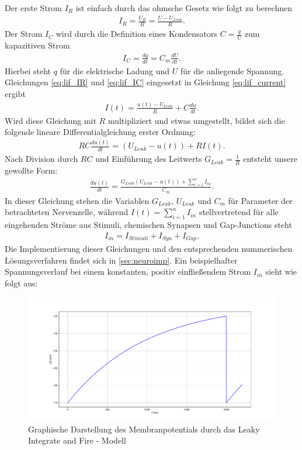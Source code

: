 	Der erste Strom $I_R$ ist einfach durch das ohmsche Gesetz wie folgt zu berechnen
	\begin{align}
		\label{eq:lif_IR}
		I_R = \frac{U_R}{R} = \frac{U - U_{Leak}}{R}\text{.}
	\end{align}
	Der Strom $I_C$ wird durch die Definition eines Kondensators $C = \tfrac{q}{U}$ zum kapazitiven Strom 
	\begin{align}
		\label{eq:lif_IC}
		I_C = \frac{dq}{dt} = C_m \frac{dU}{dt}\text{.}
	\end{align}
	Hierbei steht $q$ für die elektrische Ladung und $U$ für die anliegende Spannung.\\
	Gleichungen \ref{eq:lif_IR} und \ref{eq:lif_IC} eingesetzt in Gleichung \ref{eq:lif_current} ergibt
	\begin{align}
		\label{eq:lif_I}
		I(t) = \frac{u(t) - U_{Leak}}{R} + C\frac{du}{dt}\text{.}
	\end{align}
	Wird diese Gleichung mit $R$ multipliziert und etwas umgestellt, bildet sich die folgende lineare Differentialgleichung erster Ordnung:
	\begin{align}
		\label{eq:lif_nd}
		R C \frac{du(t)}{dt} = (U_{Leak} - u(t)) + R I(t)\text{.}
	\end{align}
	Nach Division durch $RC$ und Einführung des Leitwerts $G_{Leak} = \tfrac{1}{R}$ entsteht unsere gewollte Form:
	\begin{align}
		\label{eq:lif}
		\frac{du(t)}{dt} = \frac{G_{Leak}(U_{Leak} - u(t)) + \sum_{i = 1}^{n}{I_{in}}}{C_m}\text{.}
	\end{align}
	In dieser Gleichung stehen die Variablen $G_{Leak}$, $U_{Leak}$ und $C_m$ für Parameter der betrachteten Nervenzelle, während $I(t) = \sum_{i = 1}^{n}{I_{in}}$ stellvertretend für alle eingehenden Ströme aus Stimuli, chemischen Synapsen und Gap-Junctions steht
	\begin{align}
		\label{eq:lif_current}
		I_{in} = I_{Stimuli} + I_{Syn} + I_{Gap}\text{.}
	\end{align}
	Die Implementierung dieser Gleichungen und den entsprechenden nummerischen Lösungsverfahren findet sich in \ref{sec:neuroimp}. Ein beispielhafter Spannungsverlauf bei einem konstanten, positiv einfließendem Strom $I_{in}$ sieht wie folgt aus:
	\begin{figure}[!h]
		\centering
		\includegraphics[width=14cm]{figures/chap_lif/Simple_LIF.pdf}
		\caption{Graphische Darstellung des Membranpotentials durch das Leaky Integrate and Fire - Modell}
		\label{fig:simple_lif}
	\end{figure}\\
